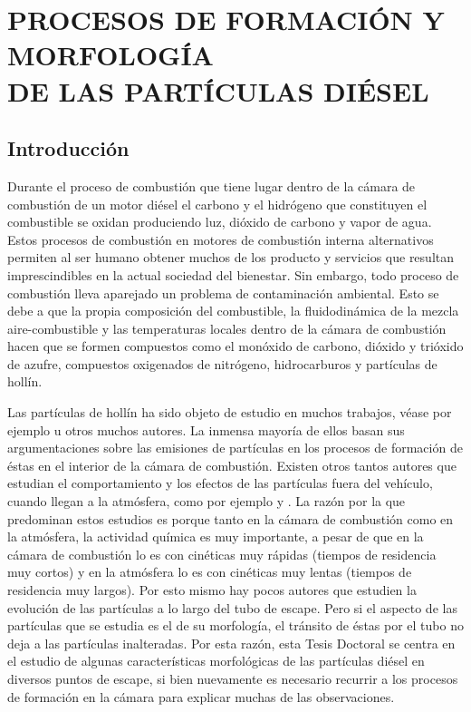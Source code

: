 \chapter{PROCESOS DE FORMACIÓN Y MORFOLOGÍA \\ DE LAS PARTÍCULAS DIÉSEL}\label{cap:ProcesosFormacionyMorfologia}
\minitoc
\newpage
\section{Introducción} \label{sec:Introduccion}

\par Durante el proceso de combustión que tiene lugar dentro de la cámara de combustión de un motor diésel el carbono y el hidrógeno que constituyen el combustible se oxidan produciendo luz, dióxido de carbono y vapor de agua. Estos procesos de combustión en motores de combustión interna alternativos permiten al ser humano obtener muchos de los producto y servicios que resultan imprescindibles en la actual sociedad del bienestar. Sin embargo, todo proceso de combustión lleva aparejado un problema de contaminación ambiental. Esto se debe a que la propia composición del combustible, la fluidodinámica de la mezcla aire-combustible y las temperaturas locales dentro de la cámara de combustión hacen que se formen compuestos como el monóxido de carbono, dióxido y trióxido de azufre, compuestos oxigenados de nitrógeno, hidrocarburos y partículas de  hollín. 
\par Las partículas de hollín ha sido objeto de estudio en muchos trabajos, véase por ejemplo \cite{chariphD:2002} u otros muchos autores. La inmensa mayoría de ellos basan sus argumentaciones sobre las emisiones de partículas en los procesos de formación de éstas en el interior de la cámara de combustión. Existen otros tantos autores que estudian el comportamiento y los efectos de las partículas fuera del vehículo, cuando llegan a la atmósfera, como por ejemplo \cite{kimetal:2001} y \cite{siegmannetal:1999}. La razón por la que predominan estos estudios es porque tanto en la cámara de combustión como en la atmósfera, la actividad química es muy importante, a pesar de que en la cámara de combustión lo es con cinéticas muy rápidas (tiempos de residencia muy cortos) y en la atmósfera lo es con cinéticas muy lentas (tiempos de residencia muy largos). Por esto mismo hay pocos autores que estudien la evolución de las partículas a lo largo del tubo de escape. Pero si el aspecto de las partículas que se estudia es el de su morfología, el tránsito de éstas por el tubo no deja a las partículas inalteradas. Por esta razón, esta Tesis Doctoral se centra en el estudio de algunas características morfológicas de las partículas diésel en diversos puntos de escape, si bien nuevamente es necesario recurrir a los procesos de formación en la cámara para explicar muchas de las observaciones.

